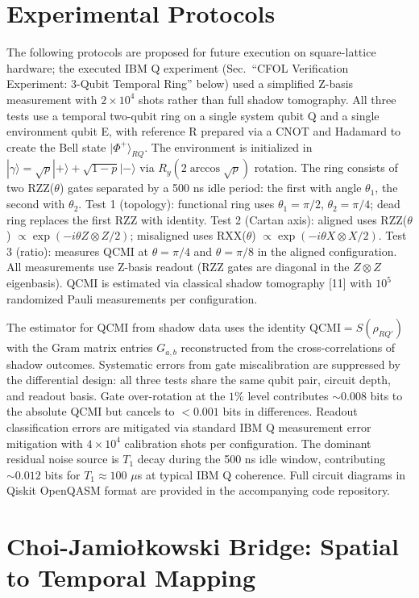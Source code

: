 \documentclass[aps,prl,superscriptaddress,nofootinbib]{revtex4-2}
\begin{document}
\section{Experimental Protocols}


The following protocols are proposed for future execution on square-lattice hardware; the executed IBM Q experiment (Sec.~``CFOL Verification Experiment: 3-Qubit Temporal Ring'' below) used a simplified Z-basis measurement with $2\times10^4$ shots rather than full shadow tomography. All three tests use a temporal two-qubit ring on a single system qubit Q and a single environment qubit E, with reference R prepared via a CNOT and Hadamard to create the Bell state $|\Phi^+\rangle_{RQ}$. The environment is initialized in $|\gamma\rangle = \sqrt{p}|+\rangle + \sqrt{1-p}|-\rangle$ via $R_y(2\arccos\sqrt{p})$ rotation. The ring consists of two RZZ($\theta$) gates separated by a 500 ns idle period: the first with angle $\theta_1$, the second with $\theta_2$. Test 1 (topology): functional ring uses $\theta_1 = \pi/2$, $\theta_2 = \pi/4$; dead ring replaces the first RZZ with identity. Test 2 (Cartan axis): aligned uses RZZ($\theta$) $\propto \exp(-i\theta Z\otimes Z/2)$; misaligned uses RXX($\theta$) $\propto \exp(-i\theta X\otimes X/2)$. Test 3 (ratio): measures QCMI at $\theta = \pi/4$ and $\theta = \pi/8$ in the aligned configuration. All measurements use Z-basis readout (RZZ gates are diagonal in the $Z\otimes Z$ eigenbasis). QCMI is estimated via classical shadow tomography [11] with $10^5$ randomized Pauli measurements per configuration.


The estimator for QCMI from shadow data uses the identity $\text{QCMI} = S(\rho_{RQ'})$ with the Gram matrix entries $G_{a,b}$ reconstructed from the cross-correlations of shadow outcomes. Systematic errors from gate miscalibration are suppressed by the differential design: all three tests share the same qubit pair, circuit depth, and readout basis. Gate over-rotation at the $1\%$ level contributes $\sim0.008$ bits to the absolute QCMI but cancels to $<0.001$ bits in differences. Readout classification errors are mitigated via standard IBM Q measurement error mitigation with $4 \times 10^4$ calibration shots per configuration. The dominant residual noise source is $T_1$ decay during the 500 ns idle window, contributing $\sim0.012$ bits for $T_1\approx 100$ $\mu$s at typical IBM Q coherence. Full circuit diagrams in Qiskit OpenQASM format are provided in the accompanying code repository.


\section{Choi-Jamio{\l}kowski Bridge: Spatial to Temporal Mapping}
\end{document}
